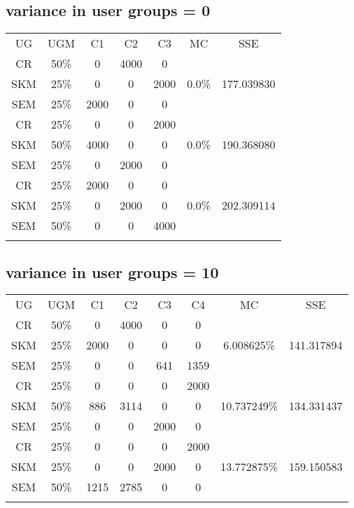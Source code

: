 \documentclass[10pt,a4paper]{article}
\begin{document}
\subsection{variance in user groups = 0}
\begin{table}[H]
	\centering
	\begin{tabular}{|c||c|c|c|c||c|c|}
		\hline
		UG & UGM & C1 & C2 & C3 & MC & SSE \\
		\hhline{|=======|}
		CR & 50\% & 0 & 4000 & 0 & \multirow{3}{*}{0.0\%} & \multirow{3}{*}{177.039830} \\
		SKM & 25\% & 0 & 0 & 2000 & & \\
		SEM & 25\% & 2000 & 0 & 0 & & \\
		\hhline{|=======|}
		CR & 25\% & 0 & 0 & 2000 & \multirow{3}{*}{0.0\%} & \multirow{3}{*}{190.368080} \\
		SKM & 50\% & 4000 & 0 & 0 & & \\
		SEM & 25\% & 0 & 2000 & 0 & & \\
		\hhline{|=======|}
		CR & 25\% & 2000 & 0 & 0 & \multirow{3}{*}{0.0\%} & \multirow{3}{*}{202.309114} \\
		SKM & 25\% & 0 & 2000 & 0 & & \\
		SEM & 50\% & 0 & 0 & 4000 & & \\
		\hhline{|=======|}
	\end{tabular}
\end{table}

\subsection{variance in user groups = 10}
\begin{table}[H]
	\centering
	\begin{tabular}{|c||c|c|c|c|c||c|c|}
		\hline
		UG & UGM & C1 & C2 & C3 & C4 & MC & SSE \\
		\hhline{|========|}
		CR & 50\% & 0 & 4000 & 0 & 0 & \multirow{3}{*}{6.008625\%} & \multirow{3}{*}{141.317894} \\
		SKM & 25\% & 2000 & 0 & 0 & 0 & & \\
		SEM & 25\% & 0 & 0 & 641 & 1359 & & \\
		\hhline{|========|}
		CR & 25\% & 0 & 0 & 0 & 2000 & \multirow{3}{*}{10.737249\%} & \multirow{3}{*}{134.331437} \\
		SKM & 50\% & 886 & 3114 & 0 & 0 & & \\
		SEM & 25\% & 0 & 0 & 2000 & 0 & & \\
		\hhline{|========|}
		CR & 25\% & 0 & 0 & 0 & 2000 & \multirow{3}{*}{13.772875\%} & \multirow{3}{*}{159.150583} \\
		SKM & 25\% & 0 & 0 & 2000 & 0 & & \\
		SEM & 50\% & 1215 & 2785 & 0 & 0 & & \\
		\hhline{|========|}
	\end{tabular}
\end{table}
\end{document}
